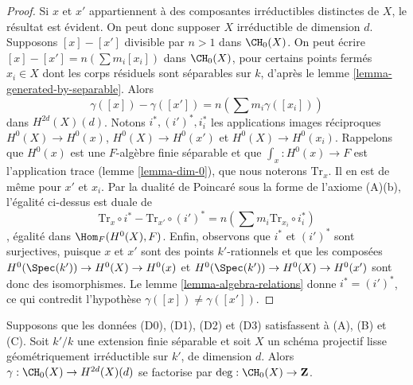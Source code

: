 \begin{proof}
Si $x$ et $x'$ appartiennent à des composantes irréductibles distinctes de $X$,
le résultat est évident. On peut donc supposer $X$ irréductible de dimension $d$.
Supposons $[x] - [x']$ divisible par $n > 1$ dans $\CH_0(X)$.
On peut écrire $[x] - [x'] = n(\sum m_i [x_i])$ dans $\CH_0(X)$,
pour certains points fermés $x_i \in X$
dont les corps résiduels sont séparables sur $k$, d'après
le lemme \ref{lemma-generated-by-separable}.
Alors
$$
\gamma([x]) - \gamma([x']) = n (\sum m_i \gamma([x_i]))
$$
dans $H^{2d}(X)(d)$. Notons $i^*, (i')^*, i_i^*$ les applications images réciproques
$H^0(X) \to H^0(x)$, $H^0(X) \to H^0(x')$ et $H^0(X) \to H^0(x_i)$.
Rappelons que $H^0(x)$ est une $F$-algèbre finie séparable
et que $\int_x : H^0(x) \to F$ est l'application trace
(lemme \ref{lemma-dim-0}), que nous noterons $\text{Tr}_x$.
Il en est de même pour $x'$ et $x_i$. Par la dualité de Poincar\'e sous la forme
de l'axiome (A)(b), l'égalité ci-dessus est duale de
$$
\text{Tr}_x \circ i^* - \text{Tr}_{x'} \circ (i')^* =
n(\sum m_i \text{Tr}_{x_i} \circ i_i^*)
$$,
égalité dans $\Hom_F(H^0(X), F)$. Enfin, observons que
$i^*$ et $(i')^*$ sont surjectives, puisque $x$ et $x'$ sont des points $k'$-rationnels
et que les composées $H^0(\Spec(k')) \to H^0(X) \to H^0(x)$
et $H^0(\Spec(k')) \to H^0(X) \to H^0(x')$ sont donc des isomorphismes.
Le lemme \ref{lemma-algebra-relations} donne $i^* = (i')^*$,
ce qui contredit l'hypothèse $\gamma([x]) \not = \gamma([x'])$.
\end{proof}

\begin{lemma}
\label{lemma-classes-points}
Supposons que les données (D0), (D1), (D2) et (D3) satisfassent à (A), (B) et (C).
Soit $k'/k$ une extension finie séparable et soit $X$ un schéma projectif lisse
géométriquement irréductible sur $k'$, de dimension $d$.
Alors $\gamma : \CH_0(X) \to H^{2d}(X)(d)$ se factorise par
$\deg : \CH_0(X) \to \mathbf{Z}$.
\end{lemma}

